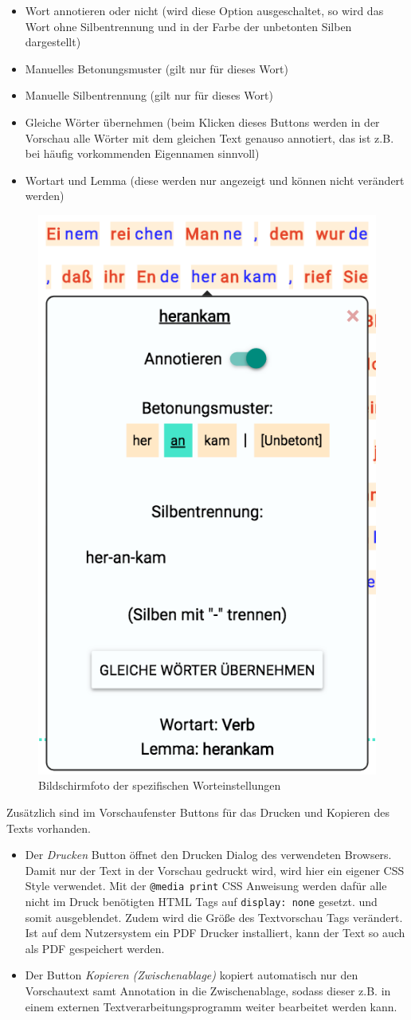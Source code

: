 \begin{itemize}
	\item Wort annotieren oder nicht (wird diese Option ausgeschaltet, so wird das Wort ohne Silbentrennung und in der Farbe der unbetonten Silben dargestellt)
	\item Manuelles Betonungsmuster (gilt nur für dieses Wort)
	\item Manuelle Silbentrennung (gilt nur für dieses Wort)
	\item Gleiche Wörter übernehmen (beim Klicken dieses Buttons werden in der Vorschau alle Wörter mit dem gleichen Text genauso annotiert, das ist z.B. bei häufig vorkommenden Eigennamen sinnvoll)
	\item Wortart und Lemma (diese werden nur angezeigt und können nicht verändert werden)
\end{itemize}

\begin{figure}[h!]
	\centering
	\includegraphics[width=.4\linewidth, frame]{figures/frontend/wordpopup}
	\caption{Bildschirmfoto der spezifischen Worteinstellungen}
	\label{fig:frontend-wordconf}
\end{figure}

Zusätzlich sind im Vorschaufenster Buttons für das Drucken und Kopieren des Texts vorhanden.
\begin{itemize}
	\item Der \textit{Drucken} Button öffnet den Drucken Dialog des verwendeten Browsers. Damit nur der Text in der Vorschau gedruckt wird, wird hier ein eigener CSS Style verwendet. Mit der \texttt{@media print} CSS Anweisung werden dafür alle nicht im Druck benötigten HTML Tags auf \texttt{display: none} gesetzt. und somit ausgeblendet. Zudem wird die Größe des Textvorschau Tags verändert. Ist auf dem Nutzersystem ein PDF Drucker installiert, kann der Text so auch als PDF gespeichert werden.
	
	\item Der Button \textit{Kopieren (Zwischenablage)} kopiert automatisch nur den Vorschautext samt Annotation in die Zwischenablage, sodass dieser z.B. in einem externen Textverarbeitungsprogramm weiter bearbeitet werden kann.
\end{itemize}

